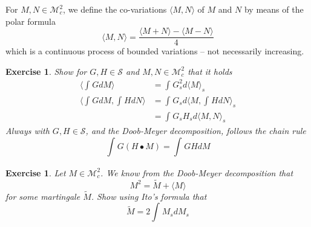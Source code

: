 \documentclass[DIV=classic,a4paper,10pt]{scrartcl}
\newtheorem{exercise}[theorem]{Exercise}
\theoremstyle{nonumberplain}
\numberwithin{equation}{section}
\begin{document}
For $M,N \in \mathcal{M}_c^2$, we define the co-variations $\langle M, N\rangle$ of $M$ and $N$ by means of the polar formula
\begin{equation*}
    \langle M,N\rangle = \frac{\langle M+N\rangle -\langle M-N\rangle}{4}
\end{equation*}
which is a continuous process of bounded variations -- not necessarily increasing.
\begin{exercise}
    Show for $G,H \in \mathcal{S}$ and $M,N \in \mathcal{M}_c^2$ that it holds
    \begin{align*}
        \langle \int_{}^{} GdM\rangle   & = \int_{}^{} G^2_sd\langle M\rangle_s\\
        \langle \int_{}^{} G dM,\int_{}^{} H dN\rangle & = \int_{}^{} G_sd \langle M,\int_{}^{} H dN\rangle_s\\
        &= \int_{}^{} G_sH_s d\langle M,N\rangle_s
    \end{align*}
    Always with $G,H \in \mathcal{S}$, and the Doob-Meyer decomposition, follows the chain rule
    \begin{equation*}
        \int_{}^{}  G\left( H\bullet M \right)=\int_{}^{} GH dM
    \end{equation*}
\end{exercise}
\begin{exercise}
    Let $M \in \mathcal{M}_c^2$.
    We know from the Doob-Meyer decomposition that
    \begin{equation*}
        M^2=\tilde{M}+\langle M\rangle
    \end{equation*}
    for some martingale $\tilde{M}$.
    Show using Ito's formula that
    \begin{equation*}
        \tilde{M}=2\int_{}^{} M_s dM_s
    \end{equation*}
\end{exercise}
\end{document}
